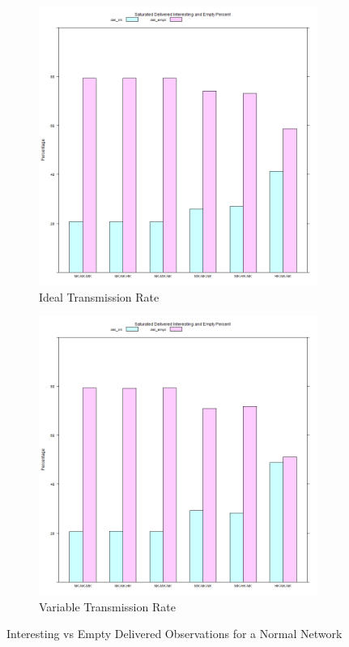 \begin{figure}[H]
\centering
\begin{subfigure}{.5\textwidth}
  \centering
\includegraphics[width=\linewidth]{Chap7/figures/plots/saturated_ideal/emptvsint_percent.png}
  \caption{Ideal Transmission Rate}
	\label{fig:sim:res:sat:ideal:emptint}
\end{subfigure}
\begin{subfigure}{.5\textwidth}
  \centering
\includegraphics[width=\linewidth]{Chap7/figures/plots/saturated_variable/emptvsint_percent.png}
  \caption{Variable Transmission Rate}
	\label{fig:sim:res:sat:variable:emptint}
\end{subfigure}
\caption{Interesting vs Empty Delivered Observations for a Normal Network}
\end{figure}



